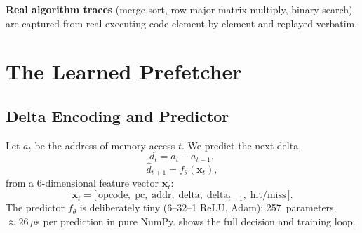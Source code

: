 \documentclass[conference]{IEEEtran}
\begin{document}
\textbf{Real algorithm traces} (merge sort, row-major matrix multiply, binary
search) are captured from real executing code element-by-element and replayed
verbatim.

\section{The Learned Prefetcher}
\label{sec:predictor}

\subsection{Delta Encoding and Predictor}

Let $a_t$ be the address of memory access $t$. We predict the next delta,
\begin{equation}
d_t = a_t - a_{t-1},
\end{equation}
\begin{equation}
\hat{d}_{t+1} = f_\theta(\mathbf{x}_t),
\end{equation}
from a 6-dimensional feature vector $\mathbf{x}_t$:
\begin{equation}
\mathbf{x}_t = \bigl[\,\text{opcode},\;\text{pc},\;\text{addr},\;\text{delta},\;\text{delta}_{t-1},\;\text{hit/miss}\,\bigr].
\end{equation}
The predictor $f_\theta$ is deliberately tiny (6--32--1 ReLU, Adam): 257~parameters,
${\approx}26\,\mu$s per prediction in pure NumPy.  shows the
full decision and training loop.
\end{document}
